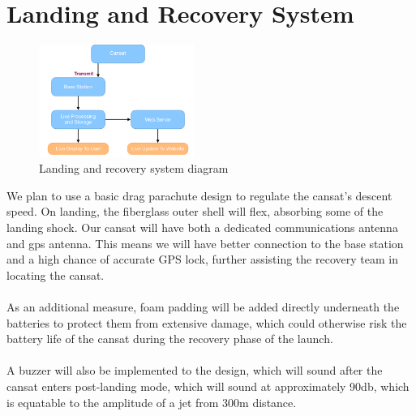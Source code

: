 \documentclass{report}
\begin{document}
	\section{Landing and Recovery System}

		\begin{figure}
			\vspace{-30pt}
	 		\begin{center}
			\includegraphics[width=0.45\textwidth]{ground}
			\end{center}
			\vspace{-15pt}
			\caption[X]{Landing and recovery system diagram}
		\end{figure}

		We plan to use a basic drag parachute design to regulate the cansat’s 
		descent speed. On landing, the fiberglass outer shell will flex, absorbing 
		some of the landing shock. Our cansat will have both a dedicated
		communications antenna and gps antenna. This means we will have 
		better connection to the base station and a high chance of accurate GPS lock,
		further assisting the recovery team in locating the cansat.
		\\\\
		{\color{blue}As an additional measure, foam padding will be added 
		directly underneath the batteries to protect them from extensive damage, which
		could otherwise risk the battery life of the cansat during the recovery phase of
		the launch.
		\\\\
		A buzzer will also be implemented to the design, which will sound
		after the cansat enters post-landing mode, which will sound at approximately
		90db, which is equatable to the amplitude of a jet from 300m distance.}
\end{document}
